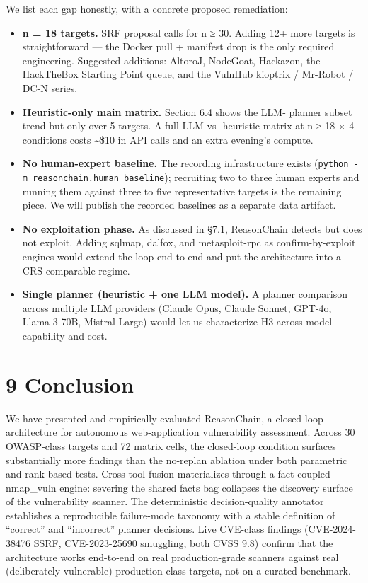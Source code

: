 \documentclass[
]{article}
\begin{document}
We list each gap honestly, with a concrete proposed remediation:

\begin{itemize}
\item
  \textbf{n = 18 targets.} SRF proposal calls for n ≥ 30. Adding 12+
  more targets is straightforward --- the Docker pull + manifest drop is
  the only required engineering. Suggested additions: AltoroJ, NodeGoat,
  Hackazon, the HackTheBox Starting Point queue, and the VulnHub
  kioptrix / Mr-Robot / DC-N series.
\item
  \textbf{Heuristic-only main matrix.} Section 6.4 shows the LLM-
  planner subset trend but only over 5 targets. A full LLM-vs- heuristic
  matrix at n ≥ 18 × 4 conditions costs \textasciitilde\$10 in API calls
  and an extra evening's compute.
\item
  \textbf{No human-expert baseline.} The recording infrastructure exists
  (\texttt{python\ -m\ reasonchain.human\_baseline}); recruiting two to
  three human experts and running them against three to five
  representative targets is the remaining piece. We will publish the
  recorded baselines as a separate data artifact.
\item
  \textbf{No exploitation phase.} As discussed in §7.1, ReasonChain
  detects but does not exploit. Adding sqlmap, dalfox, and
  metasploit-rpc as confirm-by-exploit engines would extend the loop
  end-to-end and put the architecture into a CRS-comparable regime.
\item
  \textbf{Single planner (heuristic + one LLM model).} A planner
  comparison across multiple LLM providers (Claude Opus, Claude Sonnet,
  GPT-4o, Llama-3-70B, Mistral-Large) would let us characterize H3
  across model capability and cost.
\end{itemize}

\section{9 Conclusion}\label{conclusion}

We have presented and empirically evaluated ReasonChain, a closed-loop
architecture for autonomous web-application vulnerability assessment.
Across 30 OWASP-class targets and 72 matrix cells, the closed-loop
condition surfaces substantially more findings than the no-replan
ablation under both parametric and rank-based tests. Cross-tool fusion
materializes through a fact-coupled nmap\_vuln engine: severing the
shared facts bag collapses the discovery surface of the vulnerability
scanner. The deterministic decision-quality annotator establishes a
reproducible failure-mode taxonomy with a stable definition of
``correct'' and ``incorrect'' planner decisions. Live CVE-class findings
(CVE-2024-38476 SSRF, CVE-2023-25690 smuggling, both CVSS 9.8) confirm
that the architecture works end-to-end on real production-grade scanners
against real (deliberately-vulnerable) production-class targets, not on
a curated benchmark.
\end{document}
